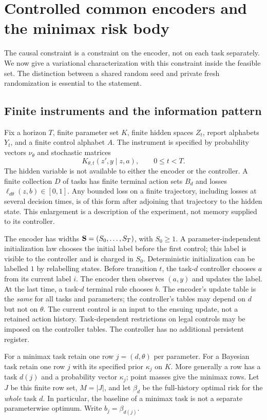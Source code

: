 \section{Controlled common encoders and the minimax risk body}
\label{sec:v9-minimax}
The causal constraint is a constraint on the encoder, not on each task
separately. We now give a variational characterization with this constraint
inside the feasible set. The distinction between a shared random seed and
private fresh randomization is essential to the statement.

\subsection{Finite instruments and the information pattern}
Fix a horizon $T$, finite parameter set $K$, finite hidden spaces $Z_t$,
report alphabets $Y_t$, and a finite control alphabet $A$. The instrument
is specified by probability vectors $\nu_\theta$ and stochastic matrices
\[
 K_{\theta,t}(z',y\mid z,a),\qquad 0\le t<T.
\]
The hidden variable is not available to either the encoder or the
controller. A finite collection $D$ of tasks has finite terminal action
sets $B_d$ and losses $\ell_{d\theta}(z,b)\in[0,1]$. Any bounded loss on a
finite trajectory, including losses at several decision times, is of this
form after adjoining that trajectory to the hidden state. This enlargement
is a description of the experiment, not memory supplied to its controller.

The encoder has widths ${\bf S}=(S_0,\ldots,S_T)$, with $S_0\ge1$. A parameter-independent initialization law chooses
the initial label before the first control; this label is visible to
the controller and is charged in $S_0$. Deterministic initialization can
be labelled $1$ by relabelling states. Before transition $t$, the task-$d$ controller chooses
$a$ from its current label $i$. The encoder then observes $(a,y)$ and
updates the label. At the last time, a task-$d$ terminal rule chooses $b$.
The encoder's update table is the \emph{same} for all tasks and parameters;
the controller's tables may depend on $d$ but not on $\theta$. The current
control is an input to the ensuing update, not a retained action history.
Task-dependent restrictions on legal controls may be imposed on the
controller tables. The controller has no additional persistent register.

For a minimax task retain one row $j=(d,\theta)$ per parameter. For a
Bayesian task retain one row $j$ with its specified prior $\kappa_j$ on
$K$. More generally a row has a task $d(j)$ and a probability vector
$\kappa_j$; point masses give the minimax rows. Let $J$ be this finite row
set, $M=|J|$, and let $\beta_d$ be the full-history optimal risk for the
\emph{whole} task $d$. In particular, the baseline of a minimax task is
not a separate parameterwise optimum. Write $b_j=\beta_{d(j)}$.

